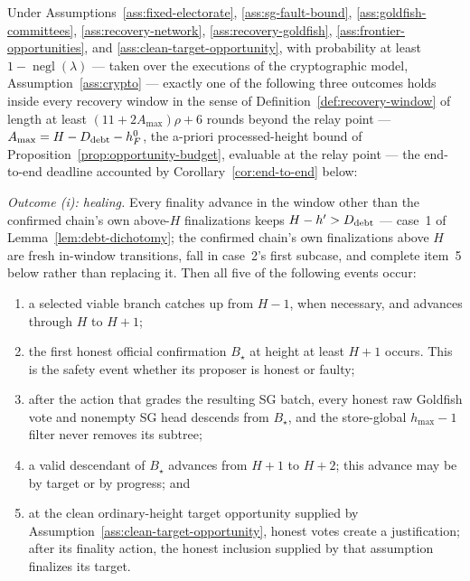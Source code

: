 \begin{theorem}
\label{thm:eventual-healing}
Under Assumptions~\ref{ass:fixed-electorate},
\ref{ass:sg-fault-bound}, \ref{ass:goldfish-committees},
\ref{ass:recovery-network}, \ref{ass:recovery-goldfish},
\ref{ass:frontier-opportunities}, and
\ref{ass:clean-target-opportunity}, with probability at least
\(1-\operatorname{negl}(\lambda)\) --- taken over the executions of
the cryptographic model, Assumption~\ref{ass:crypto} --- exactly one
of the following three outcomes holds inside every recovery window in
the sense of Definition~\ref{def:recovery-window} of length at least
\((11+2A_{\max})\rho+6\) rounds beyond the relay point ---
\(A_{\max}=H-D_{\rm debt}-h_F^0\), the a-priori processed-height
bound of Proposition~\ref{prop:opportunity-budget}, evaluable at the
relay point --- the end-to-end deadline accounted by
Corollary~\ref{cor:end-to-end} below:

\emph{Outcome (i): healing.}  Every finality advance in the window
other than the confirmed chain's own above-\(H\) finalizations keeps
\(H-h'>D_{\rm debt}\) --- case~1 of
Lemma~\ref{lem:debt-dichotomy}; the confirmed chain's own
finalizations above \(H\) are fresh in-window transitions, fall in
case~2's first subcase, and complete item~5 below rather than replacing
it.  Then all five of the following events occur:
\begin{enumerate}
 \item a selected viable branch catches up from \(H-1\), when necessary, and
   advances through \(H\) to \(H+1\);
 \item the first honest official confirmation \(B_\star\) at height at least
   \(H+1\) occurs.  This is the safety event whether its proposer is honest
   or faulty;
 \item after the action that grades the resulting SG batch, every honest raw
   Goldfish vote and nonempty SG head descends from \(B_\star\), and the
   store-global \(h_{\max}-1\) filter never removes its subtree;
 \item a valid descendant of \(B_\star\) advances from \(H+1\) to \(H+2\);
   this advance may be by target or by progress; and
 \item at the clean ordinary-height target opportunity supplied by
   Assumption~\ref{ass:clean-target-opportunity}, honest votes create a
   justification; after its finality action, the honest inclusion supplied
   by that assumption finalizes its target.
\end{enumerate}


\end{theorem}
